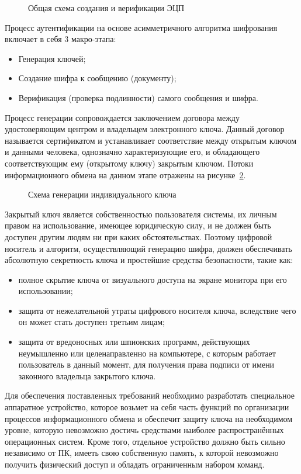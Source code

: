 \begin{figure}[h]
\center{\texttt{[image: 3-1-1]}}
\caption{Общая схема создания и верификации ЭЦП}
\label{ris:3.1.1}
\end{figure}

Процесс аутентификации на основе асимметричного алгоритма шифрования включает в
себя 3 макро-этапа:
\begin{itemize}
  \item Генерация ключей;
  \item Создание шифра к сообщению (документу);
  \item Верификация (проверка подлинности) самого сообщения и шифра.
\end{itemize}

Процесс генерации сопровождается заключением договора между удостоверяющим
центром и владельцем электронного ключа. Данный договор называется сертификатом и устанавливает
соответствие между открытым ключом и данными человека, однозначно
характеризующие его, и обладающего соответствующим ему (открытому ключу)
закрытым ключом. Потоки информационного обмена на данном этапе отражены на
рисунке~\ref{ris:3.1.2}.

\begin{figure}[h]
\center{\texttt{[image: 3-1-2]}}
\caption{Схема генерации индивидуального ключа}
\label{ris:3.1.2}
\end{figure}
  
Закрытый ключ является собственностью пользователя системы, их личным правом на
использование, имеющее юридическую силу, и не должен быть доступен другим людям
ни при каких обстоятельствах.  Поэтому цифровой носитель и алгоритм, осуществляющий генерацию
шифра, должен обеспечивать абсолютную секретность ключа и простейшие средства
безопасности, такие как:
\begin{itemize}
  \item полное скрытие ключа от визуального доступа на экране монитора при его
использовании;
  \item защита от нежелательной утраты цифрового носителя ключа,
вследствие чего он может стать доступен третьим лицам;
  \item защита от вредоносных
или шпионских программ, действующих неумышленно или целенаправленно на
компьютере, с которым работает пользователь в данный момент, для получения права
подписи от имени законного владельца закрытого ключа.
\end{itemize}

Для обеспечения поставленных требований необходимо разработать специальное
аппаратное устройство, которое возьмет на себя часть функций по организации
процессов информационного обмена и обеспечит защиту ключа на необходимом уровне,
которую невозможно достичь средствами наиболее распространённых операционных систем.
Кроме того, отдельное устройство должно быть сильно независимо от ПК, имееть
свою собственную память, к которой невозможно получить физический доступ и
обладать ограниченным набором команд.~\cite{evstifiev}
 
